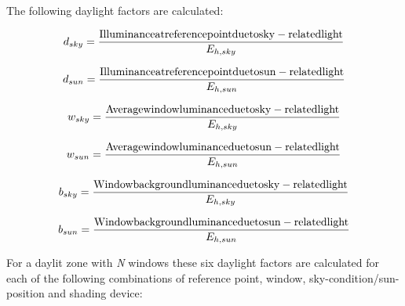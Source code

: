 The following daylight factors are calculated:

\begin{equation}
{d_{sky}} = \frac{{{\rm{Illuminance at reference point due to sky - related light}}}}{{{E_{h,sky}}}}
\end{equation}

\begin{equation}
{d_{sun}} = \frac{{{\rm{Illuminance at reference point due to sun - related light}}}}{{{E_{h,sun}}}}
\end{equation}

\begin{equation}
{w_{sky}} = \frac{{{\rm{Average window luminance due to sky - related light}}}}{{{E_{h,sky}}}}
\end{equation}

\begin{equation}
{w_{sun}} = \frac{{{\rm{Average window luminance due to sun - related light}}}}{{{E_{h,sun}}}}
\end{equation}

\begin{equation}
{b_{sky}} = \frac{{{\rm{Window background luminance due to sky - related light}}}}{{{E_{h,sky}}}}
\end{equation}

\begin{equation}
{b_{sun}} = \frac{{{\rm{Window background luminance due to sun - related light}}}}{{{E_{h,sun}}}}
\end{equation}

For a daylit zone with \emph{N} windows these six daylight factors are calculated for each of the following combinations of reference point, window, sky-condition/sun-position and shading device:

